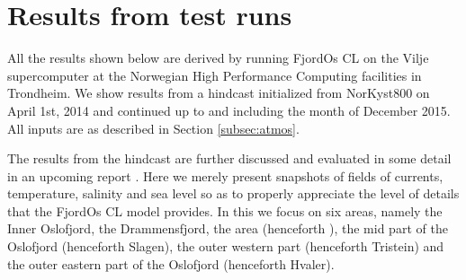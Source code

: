 \section{Results from test runs}
\label{sec:resul}
All the results shown below are derived by running FjordOs CL on the Vilje supercomputer at the Norwegian High Performance Computing facilities in Trondheim. We show results from a hindcast initialized from NorKyst800 on April 1st, 2014 and continued up to and including the month of December 2015. 
All inputs are as described in Section \ref{subsec:atmos}.
 
The results from the hindcast are further discussed and evaluated in some detail in an upcoming report \citep{hjelm:etal:2016}. Here we merely present snapshots of fields of currents, temperature, salinity and sea level so as to properly appreciate the level of details that the FjordOs CL model provides. In this we focus on six areas, namely the Inner Oslofjord, the Drammensfjord, the {\DR} area (henceforth {\DR}), the mid part of the Oslofjord (henceforth Slagen), the outer western part (henceforth Tristein) and the outer eastern part of the Oslofjord (henceforth Hvaler). 

\clearpage
   
   
   
   
   
   

   

   

   
